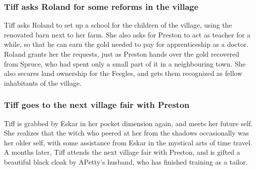 \subsubsection{\Gls{Tiff} asks \Gls{Roland} for some reforms in the village}
\Gls{Tiff} asks \Gls{Roland} to set up a school for the children of the village, using the renovated
barn next to her farm. She also asks for \Gls{Preston} to act as teacher for a while, so that he
can earn the gold needed to pay for apprenticeship as a doctor. \Gls{Roland} grants her the
requests, just as \Gls{Preston} hands over the gold recovered from \Gls{Spruce}, who had spent only
a small part of it in a neighbouring town. She also secures land ownership for the Feegles, and gets
them recognized as fellow inhabitants of the village.

\subsubsection{\Gls{Tiff} goes to the next village fair with \Gls{Preston}}
\Gls{Tiff} is grabbed by \Gls{Eskar} in her pocket dimension again, and meets her future self. She
realizes that the witch who peered at her from the shadows occasionally was her older self, with
some assistance from \Gls{Eskar} in the mystical arts of time travel. A months later, \Gls{Tiff}
attends the next village fair with \Gls{Preston}, and is gifted a beautiful black cloak by
\Gls{APetty}'s husband, who has finished training as a tailor.